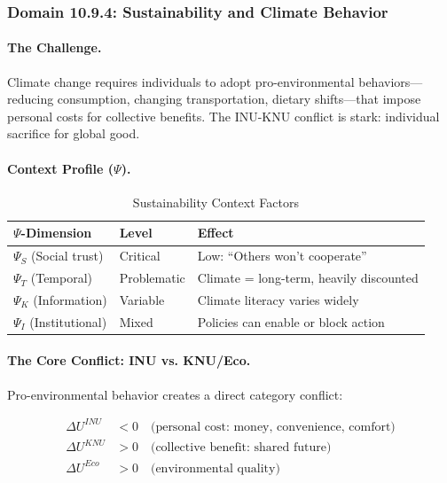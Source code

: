 \subsubsection{Domain 10.9.4: Sustainability and Climate Behavior}
\label{subsubsec:sustainability}

\paragraph{The Challenge.}
Climate change requires individuals to adopt pro-environmental behaviors---
reducing consumption, changing transportation, dietary shifts---that impose
personal costs for collective benefits. The INU-KNU conflict is stark:
individual sacrifice for global good.

\paragraph{Context Profile ($\Psi$).}

\begin{table}[htbp]
\centering
\caption{Sustainability Context Factors}
\label{tab:sustainability-psi}
\renewcommand{\arraystretch}{1.3}
\begin{tabular}{@{}lll@{}}
\toprule
\textbf{$\Psi$-Dimension} & \textbf{Level} & \textbf{Effect} \\
\midrule
$\Psi_S$ (Social trust) & Critical & Low: ``Others won't cooperate'' \\
$\Psi_T$ (Temporal) & Problematic & Climate = long-term, heavily discounted \\
$\Psi_K$ (Information) & Variable & Climate literacy varies widely \\
$\Psi_I$ (Institutional) & Mixed & Policies can enable or block action \\
\bottomrule
\end{tabular}
\end{table}

\paragraph{The Core Conflict: INU vs. KNU/Eco.}
Pro-environmental behavior creates a direct category conflict:

\begin{align}
\Delta U^{INU} &< 0 \quad \text{(personal cost: money, convenience, comfort)} \\
\Delta U^{KNU} &> 0 \quad \text{(collective benefit: shared future)} \\
\Delta U^{Eco} &> 0 \quad \text{(environmental quality)}
\end{align}

